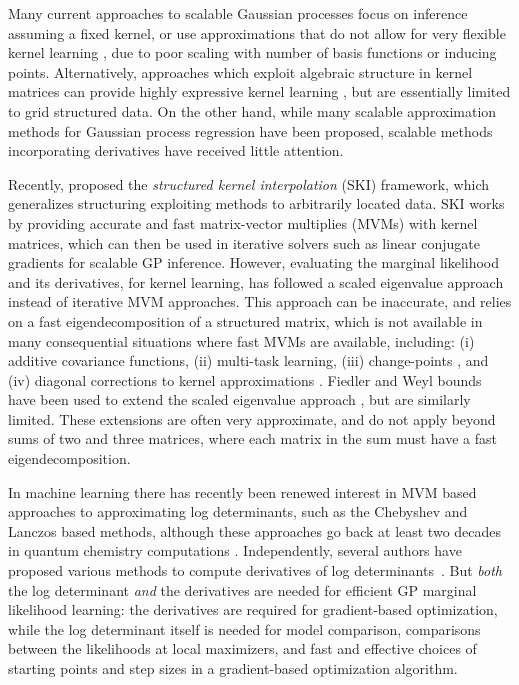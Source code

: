 Many current approaches to scalable Gaussian processes \cite[e.g.,][]
{quinonero2005unifying,le2013fastfood,hensman2013uai} focus on inference
assuming a fixed kernel, or use approximations that do not allow for very
flexible kernel learning \cite{wilson2014thesis}, due to poor scaling with
number of basis functions or inducing points. Alternatively, approaches which
exploit algebraic structure in kernel matrices can provide highly expressive
kernel learning \cite{wilson2014fast}, but are essentially limited to grid
structured data. On the other hand, while many scalable approximation methods
for Gaussian process regression have been proposed, scalable methods
incorporating derivatives have received little attention.

Recently, \citet{wilson2015kernel} proposed the {\em structured kernel
interpolation} (SKI) framework, which generalizes structuring exploiting methods
to arbitrarily located data. SKI works by providing accurate and fast
matrix\hyp{}vector multiplies (MVMs) with kernel matrices, which can then be
used in iterative solvers such as linear conjugate gradients for scalable GP
inference. However, evaluating the marginal likelihood and its derivatives, for
kernel learning, has followed a scaled eigenvalue approach 
\citep{wilson2014fast,wilson2015kernel} instead of iterative MVM approaches.
This approach can be inaccurate, and relies on a fast eigendecomposition of a
structured matrix, which is not available in many consequential situations where
fast MVMs are available, including: (i) additive covariance functions, (ii)
multi\hyp{}task learning, (iii) change\hyp{}points \citep{herlands2016scalable},
and (iv) diagonal corrections to kernel approximations 
\citep{snelson2006sparse}. Fiedler \citep{fiedler84hankelLoewner} and Weyl 
\citep{weyl1912} bounds have been used to extend the scaled eigenvalue approach 
\citep{flaxman2015fast,herlands2016scalable}, but are similarly limited. These
extensions are often very approximate, and do not apply beyond sums of two and
three matrices, where each matrix in the sum must have a fast
eigendecomposition.

In machine learning there has recently been renewed interest in MVM based
approaches to approximating log determinants, such as the Chebyshev 
\citep{han2015large} and Lanczos\citep{ubarufast} based methods, although these
approaches go back at least two decades in quantum chemistry computations 
\citep{bai1998computing}. Independently, several authors have proposed various
methods to compute derivatives of log determinants~\citep{mackay1997efficient,
stein2013stochastic}. But {\em both} the log determinant {\em and} the
derivatives are needed for efficient GP marginal likelihood learning: the
derivatives are required for gradient\hyp{}based optimization, while the log
determinant itself is needed for model comparison, comparisons between the
likelihoods at local maximizers, and fast and effective choices of starting
points and step sizes in a gradient\hyp{}based optimization algorithm.

